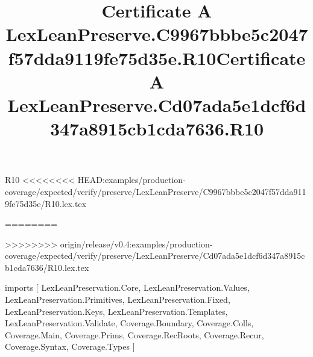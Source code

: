 \begin{lexlean}{R10}
<<<<<<<< HEAD:examples/production-coverage/expected/verify/preserve/LexLeanPreserve/C9967bbbe5c2047f57dda9119fe75d35e/R10.lex.tex
\title{Certificate A LexLeanPreserve.C9967bbbe5c2047f57dda9119fe75d35e.R10}
========
\title{Certificate A LexLeanPreserve.Cd07ada5e1dcf6d347a8915cb1cda7636.R10}
>>>>>>>> origin/release/v0.4:examples/production-coverage/expected/verify/preserve/LexLeanPreserve/Cd07ada5e1dcf6d347a8915cb1cda7636/R10.lex.tex
\begin{coremodule}
imports [
  LexLeanPreservation.Core,
  LexLeanPreservation.Values,
  LexLeanPreservation.Primitives,
  LexLeanPreservation.Fixed,
  LexLeanPreservation.Keys,
  LexLeanPreservation.Templates,
  LexLeanPreservation.Validate,
  Coverage.Boundary,
  Coverage.Colls,
  Coverage.Main,
  Coverage.Prims,
  Coverage.RecRoots,
  Coverage.Recur,
  Coverage.Syntax,
  Coverage.Types
]


\end{coremodule}
\end{lexlean}

